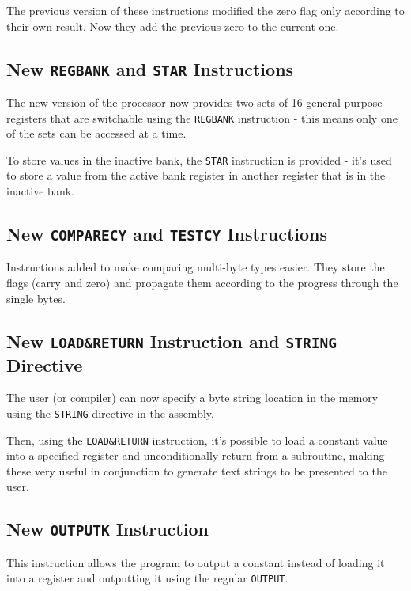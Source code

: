         The previous version of these instructions modified the zero flag only according to their own result. Now they add the previous zero to the current one.

        \subsection{New \texttt{REGBANK} and \texttt{STAR} Instructions}

        The new version of the processor now provides two sets of 16 general purpose registers that are switchable using the \texttt{REGBANK} instruction - this means only one of the sets can be accessed at a time.

        To store values in the inactive bank, the \texttt{STAR} instruction is provided - it's used to store a value from the active bank register in another register that is in the inactive bank.

        \subsection{New \texttt{COMPARECY} and \texttt{TESTCY} Instructions}

        Instructions added to make comparing multi-byte types easier. They store the flags (carry and zero) and propagate them according to the progress through the single bytes.

        \subsection{New \texttt{LOAD\&RETURN} Instruction and \texttt{STRING} Directive}

        The user (or compiler) can now specify a byte string location in the memory using the \texttt{STRING} directive in the assembly.

        Then, using the \texttt{LOAD\&RETURN} instruction, it's possible to load a constant value into a specified register and unconditionally return from a subroutine, making these very useful in conjunction to generate text strings to be presented to the user.

        \subsection{New \texttt{OUTPUTK} Instruction}

        This instruction allows the program to output a constant instead of loading it into a register and outputting it using the regular \texttt{OUTPUT}.



